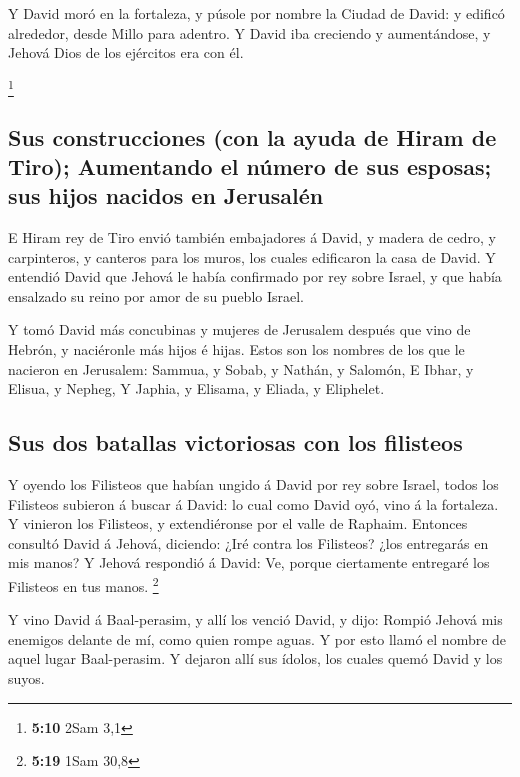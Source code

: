  Y David moró en la fortaleza, y púsole por nombre la Ciudad
de David: y edificó alrededor, desde Millo para adentro.  Y
David iba creciendo y aumentándose, y Jehová Dios de los ejércitos era
con él.

\footnote{\textbf{5:10} 2Sam 3,1}

\hypertarget{sus-construcciones-con-la-ayuda-de-hiram-de-tiro-aumentando-el-nuxfamero-de-sus-esposas-sus-hijos-nacidos-en-jerusaluxe9n}{%
\subsection{Sus construcciones (con la ayuda de Hiram de Tiro);
Aumentando el número de sus esposas; sus hijos nacidos en
Jerusalén}\label{sus-construcciones-con-la-ayuda-de-hiram-de-tiro-aumentando-el-nuxfamero-de-sus-esposas-sus-hijos-nacidos-en-jerusaluxe9n}}

 E Hiram rey de Tiro envió también embajadores á David, y
madera de cedro, y carpinteros, y canteros para los muros, los cuales
edificaron la casa de David.  Y entendió David que Jehová
le había confirmado por rey sobre Israel, y que había ensalzado su reino
por amor de su pueblo Israel.

 Y tomó David más concubinas y mujeres de Jerusalem después
que vino de Hebrón, y naciéronle más hijos é hijas.  Estos
son los nombres de los que le nacieron en Jerusalem: Sammua, y Sobab, y
Nathán, y Salomón,  E Ibhar, y Elisua, y Nepheg,
 Y Japhia, y Elisama, y Eliada, y Eliphelet.

\hypertarget{sus-dos-batallas-victoriosas-con-los-filisteos}{%
\subsection{Sus dos batallas victoriosas con los
filisteos}\label{sus-dos-batallas-victoriosas-con-los-filisteos}}

 Y oyendo los Filisteos que habían ungido á David por rey
sobre Israel, todos los Filisteos subieron á buscar á David: lo cual
como David oyó, vino á la fortaleza.  Y vinieron los
Filisteos, y extendiéronse por el valle de Raphaim. 
Entonces consultó David á Jehová, diciendo: ¿Iré contra los Filisteos?
¿los entregarás en mis manos? Y Jehová respondió á David: Ve, porque
ciertamente entregaré los Filisteos en tus manos. \footnote{\textbf{5:19}
  1Sam 30,8}

 Y vino David á Baal-perasim, y allí los venció David, y
dijo: Rompió Jehová mis enemigos delante de mí, como quien rompe aguas.
Y por esto llamó el nombre de aquel lugar Baal-perasim.  Y
dejaron allí sus ídolos, los cuales quemó David y los suyos.


